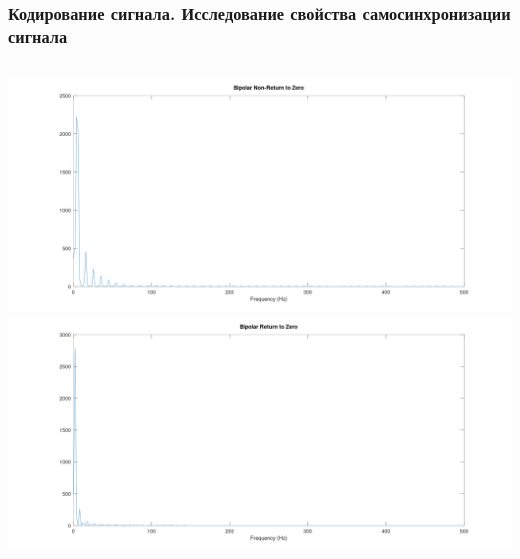 \begin{frame}
\frametitle{Кодирование сигнала. Исследование свойства самосинхронизации сигнала}
\begin{columns}
            \includegraphics[width=\textwidth]{../octave/coding/spectre/bipolarnrz.png}
            \includegraphics[width=\textwidth]{../octave/coding/spectre/bipolarrz.png}
\end{columns}
\end{frame}

